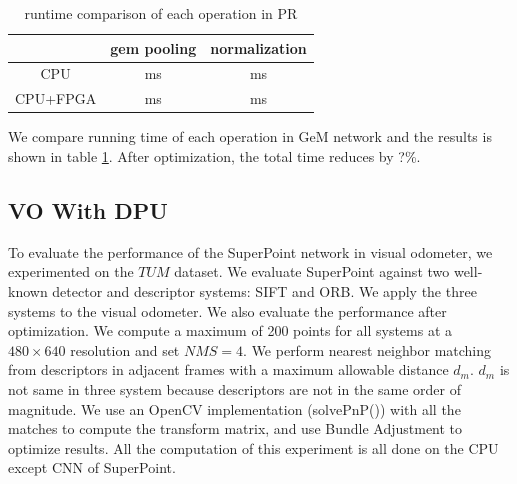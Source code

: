 \begin{table}
    \label{tab:gem_eff}
    \centering 
    \caption{runtime comparison of each operation in PR}
    \begin{tabular}{|c|c|c|}
				\hline
              & gem pooling & normalization \\
        \hline
        CPU   &   ms &   ms \\
        \hline
        CPU+FPGA &   ms &   ms \\
			  \hline
    \end{tabular}
  \end{table}

We compare running time of each operation in GeM network and the results is shown in table \ref{tab:gem_eff}. After optimization, the total time reduces by ?\%.


\subsection{ VO With DPU }

To evaluate the performance of the SuperPoint network in visual odometer, we experimented on the $TUM$ dataset. We evaluate SuperPoint against two well-known detector and descriptor systems: SIFT\cite{Lowe-478} and ORB\cite{RubleeRabaud-479}. We apply the three systems to the visual odometer. We also evaluate the performance after optimization. We compute a maximum of 200 points for all systems at a $480\times640$ resolution and set $NMS=4$. We perform nearest neighbor matching from descriptors in adjacent frames with a maximum allowable distance $d_m$. $d_m$ is not same in three system because descriptors are not in the same order of magnitude. We use an OpenCV implementation (solvePnP()) with all the matches to compute the transform matrix, and use Bundle Adjustment to optimize results. All the computation of this experiment is all done on the CPU except CNN of SuperPoint. 

